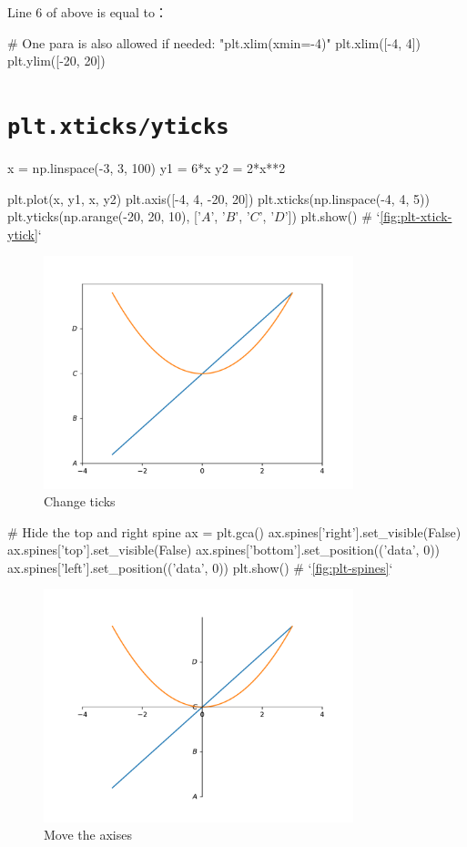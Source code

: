 \documentclass{report}
\begin{document}
Line 6 of above is equal to：
\begin{py}
# One para is also allowed if needed: "plt.xlim(xmin=-4)"
plt.xlim([-4, 4]) 
plt.ylim([-20, 20])
\end{py}

\section{\texttt{plt.xticks/yticks}}
\begin{py}
x = np.linspace(-3, 3, 100)
y1 = 6*x
y2 = 2*x**2

plt.plot(x, y1, x, y2)
plt.axis([-4, 4, -20, 20])
plt.xticks(np.linspace(-4, 4, 5))
plt.yticks(np.arange(-20, 20, 10), ['$A$', '$B$', '$C$', '$D$'])
plt.show() # `\autoref{fig:plt-xtick-ytick}`
\end{py}

\begin{figure}[!htb]
  \centering
  \includegraphics[width=90mm]{plt-xtick-ytick}
  \caption{Change ticks}
  \label{fig:plt-xtick-ytick}
\end{figure}

\begin{py}
# Hide the top and right spine
ax = plt.gca()
ax.spines['right'].set_visible(False)
ax.spines['top'].set_visible(False)
ax.spines['bottom'].set_position(('data', 0))
ax.spines['left'].set_position(('data', 0))
plt.show() # `\autoref{fig:plt-spines}`
\end{py}

\begin{figure}[!htb]
  \centering
  \includegraphics[width=90mm]{plt-spines}
  \caption{Move the axises}
  \label{fig:plt-spines}
\end{figure}
\end{document}
